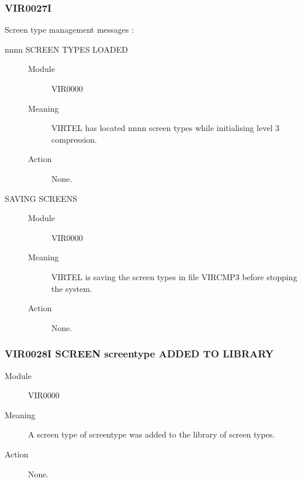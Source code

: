 \documentclass[letterpaper,10pt,english]{sphinxmanual}
\begin{document}
\subsubsection{VIR0027I}
\label{\detokenize{messages:vir0027i}}
Screen type management messages :
\begin{description}
\item[{nnnn SCREEN TYPES LOADED}] \leavevmode\begin{description}
\item[{Module}] \leavevmode
VIR0000

\item[{Meaning}] \leavevmode
VIRTEL has located nnnn screen types while initialising level 3 compression.

\item[{Action}] \leavevmode
None.

\end{description}

\item[{SAVING SCREENS}] \leavevmode\begin{description}
\item[{Module}] \leavevmode
VIR0000

\item[{Meaning}] \leavevmode
VIRTEL is saving the screen types in file VIRCMP3 before stopping the system.

\item[{Action}] \leavevmode
None.

\end{description}

\end{description}


\subsubsection{VIR0028I SCREEN screentype ADDED TO LIBRARY}
\label{\detokenize{messages:vir0028i-screen-screentype-added-to-library}}\begin{description}
\item[{Module}] \leavevmode
VIR0000

\item[{Meaning}] \leavevmode
A screen type of screentype was added to the library of screen types.

\item[{Action}] \leavevmode
None.

\end{description}
\end{document}
